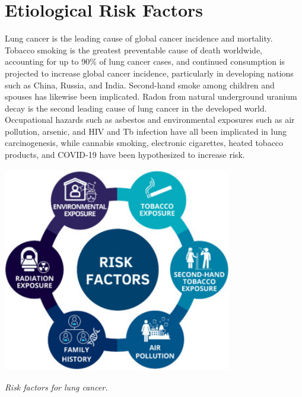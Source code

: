 
\section{Etiological Risk Factors}

Lung cancer is the leading cause of global cancer incidence and mortality. Tobacco smoking is the 
greatest preventable cause of death worldwide, accounting for up to 90\% of lung cancer cases, and 
continued consumption is projected to increase global cancer incidence, particularly in developing 
nations such as China, Russia, and India. Second-hand smoke among children and spouses has likewise 
been implicated. Radon from natural underground uranium decay is the second leading cause of lung 
cancer in the developed world. Occupational hazards such as asbestos and environmental exposures 
such as air pollution, arsenic, and HIV and Tb infection have all been implicated in lung 
carcinogenesis, while cannabis smoking, electronic cigarettes, heated tobacco products, and COVID-19 
have been hypothesized to increase risk. \cite{PMC8063897}

\vspace{1em}
\begin{center} 
    \includegraphics[width = 10cm, height = 9cm]{../assets/02-etiology/risk-factors-lunf-cancer.jpg}

    \small\textit{Risk factors for lung cancer. \cite{florez2023lung}}
\end{center}
\vspace{1em}

